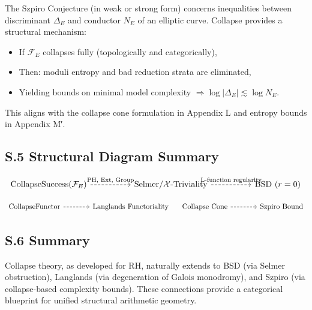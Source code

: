 \documentclass[11pt]{article}
\newcommand{\Sha}{\mathcal{X}}
\begin{document}
The Szpiro Conjecture (in weak or strong form) concerns inequalities between discriminant \( \Delta_E \) and conductor \( N_E \) of an elliptic curve. Collapse provides a structural mechanism:

\begin{itemize}
  \item If \( \mathcal{F}_E \) collapses fully (topologically and categorically),
  \item Then: moduli entropy and bad reduction strata are eliminated,
  \item Yielding bounds on minimal model complexity \( \Rightarrow \log |\Delta_E| \lesssim \log N_E \).
\end{itemize}

This aligns with the collapse cone formulation in Appendix L and entropy bounds in Appendix M′.

\subsection*{S.5 Structural Diagram Summary}

\[
\begin{tikzcd}[column sep=huge]
\text{CollapseSuccess}(\mathcal{F}_E)
\arrow[r, dashed, "\text{PH, Ext, Group}"] & \text{Selmer/} \Sha\text{-Triviality}
\arrow[r, dashed, "\text{L-function regularity}"] & \text{BSD } (r=0)
\end{tikzcd}
\]

\[
\begin{tikzcd}[column sep=large]
\text{CollapseFunctor} \arrow[r, dashed] & \text{Langlands Functoriality}
\end{tikzcd}
\quad
\begin{tikzcd}[column sep=large]
\text{Collapse Cone} \arrow[r, dashed] & \text{Szpiro Bound}
\end{tikzcd}
\]

\subsection*{S.6 Summary}

Collapse theory, as developed for RH, naturally extends to BSD (via Selmer obstruction), Langlands (via degeneration of Galois monodromy), and Szpiro (via collapse-based complexity bounds). These connections provide a categorical blueprint for unified structural arithmetic geometry.



\appendix
\end{document}
